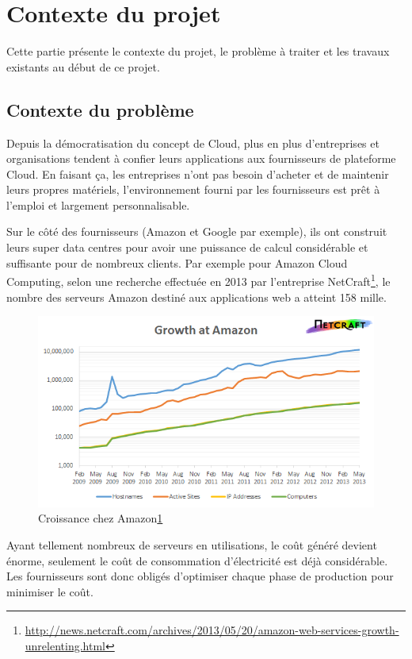 \chapter{Contexte du projet}
Cette partie présente le contexte du projet, le problème à traiter et les travaux existants au début de ce projet.


\section{Contexte du problème}
Depuis la démocratisation du concept de Cloud, plus en plus d'entreprises et organisations tendent à confier leurs applications aux fournisseurs de plateforme Cloud. En faisant ça, les entreprises n'ont pas besoin d'acheter et de maintenir leurs propres matériels, l'environnement fourni par les fournisseurs est prêt à l'emploi et largement personnalisable.


Sur le côté des fournisseurs (Amazon et Google par exemple), ils ont construit leurs super data centres pour avoir une puissance de calcul considérable et suffisante pour de nombreux clients. Par exemple pour Amazon Cloud Computing, selon une recherche effectuée en 2013 par l'entreprise NetCraft\footnote{\label{fn1}\url{http://news.netcraft.com/archives/2013/05/20/amazon-web-services-growth-unrelenting.html}}, le nombre des serveurs Amazon destiné aux applications web a atteint 158 mille.
\bigskip
\begin{figure}[!htbp]
	\centering
		\includegraphics[scale=0.8]{pics/AMZN-growth.png}
	\caption{Croissance chez Amazon\ref{fn1}}
	\label{fig:amazon-growth}
\end{figure}
\bigskip


Ayant tellement nombreux de serveurs en utilisations, le coût généré devient énorme, seulement le coût de consommation d'électricité est déjà considérable. Les fournisseurs sont donc obligés d'optimiser chaque phase de production pour minimiser le coût. 

